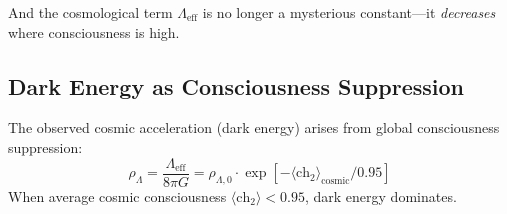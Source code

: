 And the cosmological term $\Lambda_{\text{eff}}$ is no longer a mysterious constant—it \textit{decreases} where consciousness is high.

\subsection{Dark Energy as Consciousness Suppression}

\begin{proposition}\label{prop:dark-energy}
The observed cosmic acceleration (dark energy) arises from global consciousness suppression:
\begin{equation}
\rho_\Lambda = \frac{\Lambda_{\text{eff}}}{8\pi G} = \rho_{\Lambda,0} \cdot \exp\left[ -\langle \text{ch}_2 \rangle_{\text{cosmic}} / 0.95 \right]
\end{equation}
When average cosmic consciousness $\langle \text{ch}_2 \rangle < 0.95$, dark energy dominates.
\end{proposition}

